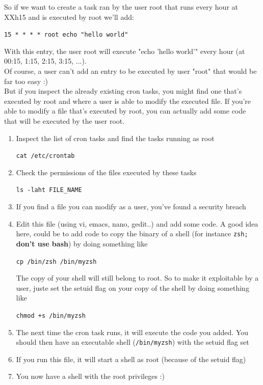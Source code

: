 \documentclass{article}
\begin{document}
\noindent So if we want to create a task ran by the user root that runs every hour at XXh15 and is executed by root we'll add:
\begin{center}
    \lstinline{15 * * * * root echo "hello world"}
\end{center}
With this entry, the user root will execute "echo 'hello world'" every hour (at 00:15, 1:15, 2:15, 3:15, ...).\\

\noindent Of course, a user can't add an entry to be executed by user "root" that would be far too easy :)\\

\noindent But if you inspect the already existing cron tasks, you might find one that's executed by root and where a user is able to modify the executed file.
If you're able to modify a file that's executed by root, you can actually add some code that will be executed by the user root.
\begin{enumerate}
    \item Inspect the list of cron tasks and find the tasks running as root
    \begin{center}
    \lstinline{cat /etc/crontab}
    \end{center}
    \item Check the permissions of the files executed by these tasks
    \begin{center}
    \lstinline{ls -laht FILE_NAME}
    \end{center}
    \item If you find a file you can modify as a user, you've found a security breach
    \item Edit this file (using vi, emacs, nano, gedit..) and add some code.
   A good idea here, could be to add code to copy the binary of a shell (for instance \lstinline{zsh;} \textbf{don't use bash}) by doing something like 
   \begin{center}
    \lstinline{cp /bin/zsh /bin/myzsh}
    \end{center}
   The copy of your shell will still belong to root. So to make it exploitable by a user, juste set the setuid flag on your copy of the shell
   by doing something like 
   \begin{center}
    \lstinline{chmod +s /bin/myzsh}
    \end{center}
    \item The next time the cron task runs, it will execute the code you added. You should then have an executable shell (\lstinline{/bin/myzsh}) with the setuid flag set
    \item If you run this file, it will start a shell as root (because of the setuid flag)
    \item You now have a shell with the root privileges :) 
\end{enumerate}
\end{document}
